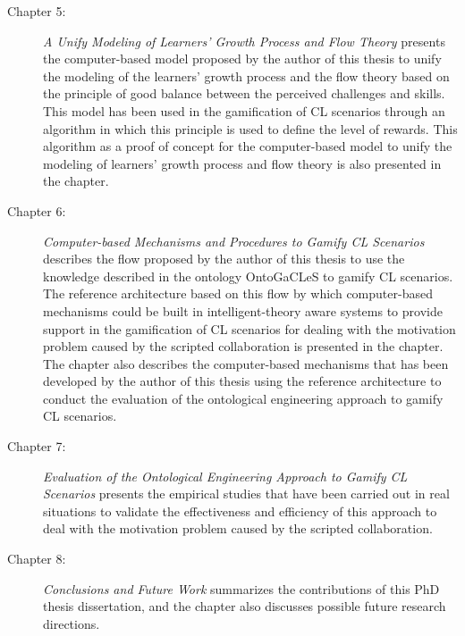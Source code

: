 \begin{description}
\item[Chapter 5:]
\emph{A Unify Modeling of Learners' Growth Process and Flow Theory} presents the computer-based model proposed by the author of this thesis to unify the modeling of the learners' growth process and the flow theory based on the principle of good balance between the perceived challenges and skills. This model has been used in the gamification of CL scenarios through an algorithm in which this principle is used to define the level of rewards. This algorithm as a proof of concept for the computer-based model to unify the modeling of learners' growth process and flow theory is also presented in the chapter.

\item[Chapter 6:]
\emph{Computer-based Mechanisms and Procedures to Gamify CL Scenarios} describes the flow proposed by the author of this thesis to use the knowledge described in the ontology OntoGaCLeS to gamify CL scenarios. The reference architecture based on this flow by which computer-based mechanisms could be built in intelligent-theory aware systems to provide support in the gamification of CL scenarios for dealing with the motivation problem caused by the scripted collaboration is presented in the chapter. The chapter also describes the computer-based mechanisms that has been developed by the author of this thesis using the reference architecture to conduct the evaluation of the ontological engineering approach to gamify CL scenarios.

\item[Chapter 7:]
\emph{Evaluation of the Ontological Engineering Approach to Gamify CL Scenarios} presents the empirical studies that have been carried out in real situations to validate the effectiveness and efficiency of this approach to deal with the motivation problem caused by the scripted collaboration.

\item[Chapter 8:]
\emph{Conclusions and Future Work} summarizes the contributions of this PhD thesis dissertation, and the chapter also discusses possible future research directions.

\end{description}




